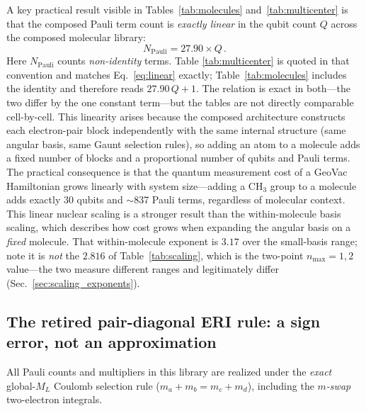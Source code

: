\documentclass[twocolumn,pra,amsmath,amssymb,superscriptaddress]{revtex4-2}
\newcommand{\gvq}[2]{#2}
\begin{document}
A key practical result visible in Tables~\ref{tab:molecules}
and~\ref{tab:multicenter} is that the composed Pauli term count is
\emph{exactly linear} in the qubit count $Q$ across the composed molecular library:
\begin{equation}
  N_{\text{Pauli}} = \gvq{composed_coeff}{27.90} \times Q\,.
  \label{eq:linear}
\end{equation}
Here $N_{\text{Pauli}}$ counts \emph{non-identity} terms.  Table
\ref{tab:multicenter} is quoted in that convention and matches
Eq.~\eqref{eq:linear} exactly; Table~\ref{tab:molecules} includes the
identity and therefore reads $27.90\,Q + 1$.  The relation is exact in
both---the two differ by the one constant term---but the tables are not
directly comparable cell-by-cell.
This linearity arises because the composed architecture constructs
each electron-pair block independently with the same internal structure
(same angular basis, same Gaunt selection rules), so adding an atom
to a molecule adds a fixed number of blocks and a proportional number
of qubits and Pauli terms.  The practical consequence is that the
quantum measurement cost of a GeoVac Hamiltonian grows linearly with
system size---adding a CH$_3$ group to a molecule adds exactly 30
qubits and $\sim$\gvq{lih_composed_pauli}{837} Pauli terms, regardless of molecular context.
This linear nuclear scaling is a stronger result than the
within-molecule basis scaling, which describes how cost grows when
expanding the angular basis on a \emph{fixed} molecule.  That
within-molecule exponent is $3.17$ over the small-basis range; note it is
\emph{not} the $2.816$ of Table~\ref{tab:scaling}, which is the two-point
$n_{\max}=1,2$ value---the two measure different ranges and legitimately
differ (Sec.~\ref{sec:scaling_exponents}).

\subsection{The retired pair-diagonal ERI rule: a sign error, not an approximation}
\label{sec:eri_rule}

All Pauli counts and multipliers in this library are realized under the
\emph{exact} global-$M_L$ Coulomb selection rule
($m_a + m_b = m_c + m_d$), including the \emph{$m$-swap} two-electron
integrals.
\end{document}
